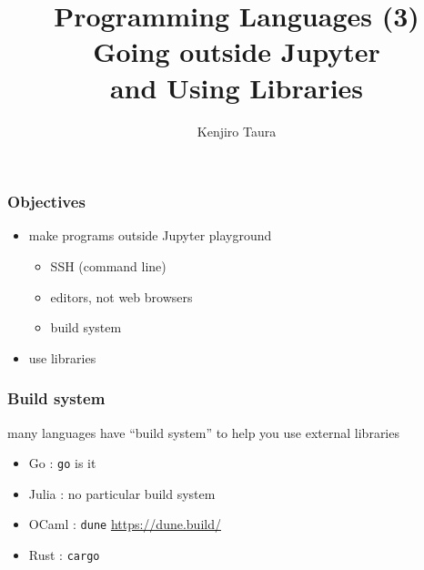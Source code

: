 \documentclass[12pt,dvipdfmx]{beamer}
\title{Programming Languages (3) \\
  Going outside Jupyter \\
  and Using Libraries}
\institute{}
\author{Kenjiro Taura}
\date{}
\begin{document}
\maketitle


\begin{frame}
  \frametitle{Objectives}
  \begin{itemize}
  \item make programs outside Jupyter playground
    \begin{itemize}
    \item SSH (command line)
    \item editors, not web browsers
    \item build system
    \end{itemize}
  \item use libraries
  \end{itemize}
\end{frame}

\begin{frame}
  \frametitle{Build system}
  many languages have ``build system'' to help you
    use external libraries
  \begin{itemize}
  \item Go : {\tt go} is it
  \item Julia : no particular build system
  \item OCaml : {\tt dune} \url{https://dune.build/}
  \item Rust : {\tt cargo} 
  \end{itemize}
\end{frame}
\end{document}
